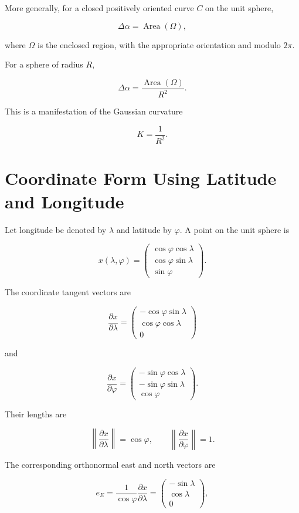 \documentclass[12pt,a4paper]{article}
\theoremstyle{notespace}
\begin{document}
More generally, for a closed positively oriented curve \(C\) on the
unit sphere,

\[
\boxed{
	\Delta\alpha
	=
	\operatorname{Area}(\Omega),
}
\]

where \(\Omega\) is the enclosed region, with the appropriate orientation
and modulo \(2\pi\).

For a sphere of radius \(R\),

\[
\boxed{
	\Delta\alpha
	=
	\frac{\operatorname{Area}(\Omega)}{R^2}.
}
\]

This is a manifestation of the Gaussian curvature

\[
K=\frac{1}{R^2}.
\]

\section{Coordinate Form Using Latitude and Longitude}

Let longitude be denoted by \(\lambda\) and latitude by \(\varphi\). A
point on the unit sphere is

\[
x(\lambda,\varphi)
=
\begin{pmatrix}
	\cos\varphi\cos\lambda\\
	\cos\varphi\sin\lambda\\
	\sin\varphi
\end{pmatrix}.
\]

The coordinate tangent vectors are

\[
\frac{\partial x}{\partial\lambda}
=
\begin{pmatrix}
	-\cos\varphi\sin\lambda\\
	\cos\varphi\cos\lambda\\
	0
\end{pmatrix}
\]

and

\[
\frac{\partial x}{\partial\varphi}
=
\begin{pmatrix}
	-\sin\varphi\cos\lambda\\
	-\sin\varphi\sin\lambda\\
	\cos\varphi
\end{pmatrix}.
\]

Their lengths are

\[
\left\|
\frac{\partial x}{\partial\lambda}
\right\|
=
\cos\varphi,
\qquad
\left\|
\frac{\partial x}{\partial\varphi}
\right\|
=
1.
\]

The corresponding orthonormal east and north vectors are

\[
\boxed{
	e_E
	=
	\frac{1}{\cos\varphi}
	\frac{\partial x}{\partial\lambda}
	=
	\begin{pmatrix}
		-\sin\lambda\\
		\cos\lambda\\
		0
	\end{pmatrix},
}
\]
\end{document}
